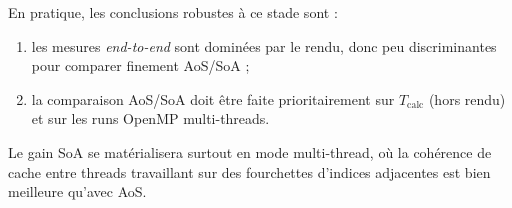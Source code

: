 En pratique, les conclusions robustes à ce stade sont :

\begin{enumerate}
    \item les mesures \emph{end-to-end} sont dominées par le rendu, donc peu discriminantes
        pour comparer finement AoS/SoA ;
    \item la comparaison AoS/SoA doit être faite prioritairement sur
        \(T_{\mathrm{calc}}\) (hors rendu) et sur les runs OpenMP multi-threads.
\end{enumerate}

Le gain SoA se matérialisera surtout en mode multi-thread, où la cohérence de cache
entre threads travaillant sur des fourchettes d'indices adjacentes est bien meilleure
qu'avec AoS.

